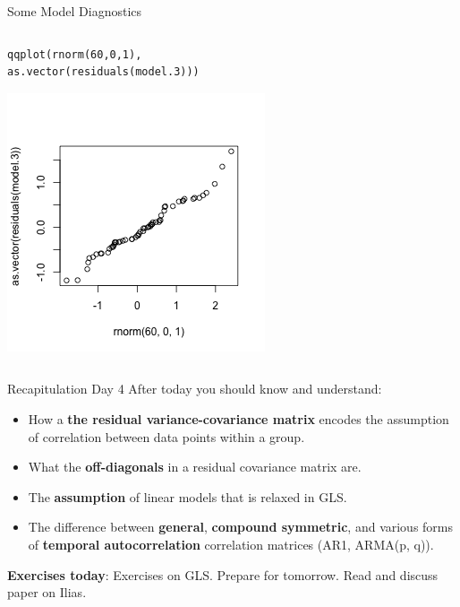 \documentclass{beamer}
\begin{document}
\begin{frame}[fragile]{Some Model Diagnostics}
\begin{columns}
\begin{column}{0.5\textwidth}
\begin{verbatim}
qqplot(rnorm(60,0,1), 
as.vector(residuals(model.3)))
    \end{verbatim}
    \includegraphics[width=\textwidth]{lectures/day_4_GLS/figures/unnamed-chunk-48-1.png}
         
    \end{column}  
    \end{columns}
\end{frame}

\begin{frame}{Recapitulation Day 4}
  After today you should know and understand:
  \begin{itemize}
    \item How a \textbf{the residual variance-covariance matrix} encodes the assumption of correlation between data points within a group.
    \item What the \textbf{off-diagonals} in a residual covariance matrix are.
    \item The \textbf{assumption} of linear models that is relaxed in GLS.
    \item The difference between \textbf{general}, \textbf{compound symmetric}, and various forms of \textbf{temporal autocorrelation} correlation matrices (AR1, ARMA(p, q)).
  \end{itemize}
  \textbf{Exercises today}: Exercises on GLS. Prepare for tomorrow. Read and discuss paper on Ilias.
\end{frame}
\end{document}
